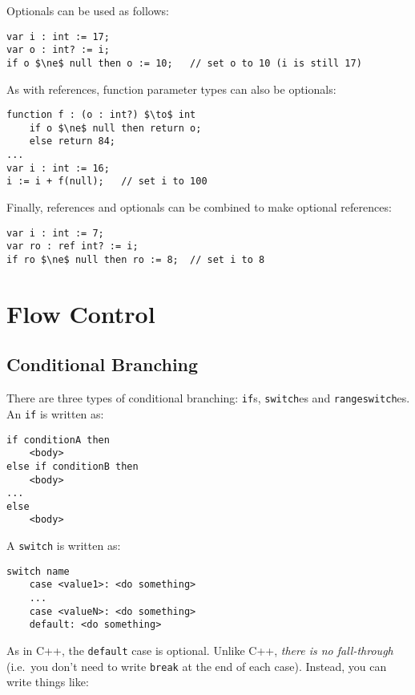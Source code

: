 \noindent Optionals can be used as follows:

\begin{lstlisting}[style=Snippet]
var i : int := 17;
var o : int? := i;
if o $\ne$ null then o := 10;	// set o to 10 (i is still 17)
\end{lstlisting}

\noindent As with references, function parameter types can also be optionals:

\begin{lstlisting}[style=Snippet]
function f : (o : int?) $\to$ int
	if o $\ne$ null then return o;
	else return 84;
...
var i : int := 16;
i := i + f(null);	// set i to 100
\end{lstlisting}

\noindent Finally, references and optionals can be combined to make optional references:

\begin{lstlisting}[style=Snippet]
var i : int := 7;
var ro : ref int? := i;
if ro $\ne$ null then ro := 8;	// set i to 8
\end{lstlisting}

\section{Flow Control}

\subsection{Conditional Branching}

There are three types of conditional branching: \lstinline[language=Pseudocode]$if$s, \lstinline[language=Pseudocode]$switch$es and \lstinline[language=Pseudocode]$rangeswitch$es. An \lstinline[language=Pseudocode]$if$ is written as:

\begin{lstlisting}[style=Snippet]
if conditionA then
	<body>
else if conditionB then
	<body>
...
else
	<body>
\end{lstlisting}
%
A \lstinline[language=Pseudocode]$switch$ is written as:

\begin{lstlisting}[style=Snippet]
switch name
	case <value1>: <do something>
	...
	case <valueN>: <do something>
	default: <do something>
\end{lstlisting}
%
As in C++, the \lstinline[language=Pseudocode]$default$ case is optional. Unlike C++, \emph{there is no fall-through} (i.e.~you don't need to write \lstinline[language=Pseudocode]$break$ at the end of each case). Instead, you can write things like:

